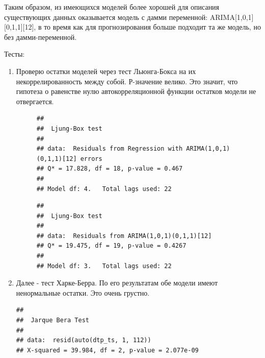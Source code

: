 \documentclass[14pt, a4paper]{extarticle}\usepackage[]{graphicx}\usepackage[]{color}
\makeatletter
\newenvironment{kframe}{%
 \def\at@end@of@kframe{}%
 \ifinner\ifhmode%
  \def\at@end@of@kframe{\end{minipage}}%
  \begin{minipage}{\columnwidth}%
 \fi\fi%
 \def\FrameCommand##1{\hskip\@totalleftmargin \hskip-\fboxsep
 \colorbox{shadecolor}{##1}\hskip-\fboxsep
     \hskip-\linewidth \hskip-\@totalleftmargin \hskip\columnwidth}%
 \MakeFramed {\advance\hsize-\width
   \@totalleftmargin\z@ \linewidth\hsize
   \@setminipage}}%
 {\par\unskip\endMakeFramed%
 \at@end@of@kframe}
\newenvironment{knitrout}{}{} %
\makeatother
\begin{document}
Таким образом, из имеющихся моделей более хорошей для описания существующих данных оказывается модель с дамми переменной: ARIMA[1,0,1][0,1,1][12], в то время как для прогнозирования больше подходит та же модель, но без дамми-переменной. 

Тесты:
\begin{enumerate}
\item Проверю остатки моделей через тест Льюнга-Бокса на их некоррелированность между собой. Р-значение велико. Это значит, что гипотеза о равенстве нулю автокорреляционной функции остатков модели не отвергается. 
\begin{figure}[H]
\begin{knitrout}
\color{fgcolor}\begin{kframe}
\begin{verbatim}
## 
## 	Ljung-Box test
## 
## data:  Residuals from Regression with ARIMA(1,0,1)(0,1,1)[12] errors
## Q* = 17.828, df = 18, p-value = 0.467
## 
## Model df: 4.   Total lags used: 22
\end{verbatim}
\end{kframe}
\end{knitrout}
\end{figure}
\begin{figure}[H]
\begin{knitrout}
\color{fgcolor}\begin{kframe}
\begin{verbatim}
## 
## 	Ljung-Box test
## 
## data:  Residuals from ARIMA(1,0,1)(0,1,1)[12]
## Q* = 19.475, df = 19, p-value = 0.4267
## 
## Model df: 3.   Total lags used: 22
\end{verbatim}
\end{kframe}
\end{knitrout}
\end{figure}

\item Далее - тест Харке-Берра. По его результатам обе модели имеют ненормальные остатки. Это очень грустно.
\begin{knitrout}
\color{fgcolor}\begin{kframe}
\begin{verbatim}
## 
## 	Jarque Bera Test
## 
## data:  resid(auto(dtp_ts, 1, 112))
## X-squared = 39.984, df = 2, p-value = 2.077e-09
\end{verbatim}
\end{kframe}
\end{knitrout}



\end{enumerate}
\end{document}
